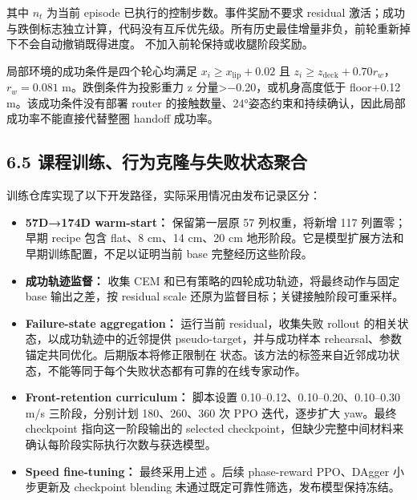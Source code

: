 \documentclass[
  10pt,
  a4paper,
]{article}
\providecommand{\tightlist}{%
  \setlength{\itemsep}{0pt}\setlength{\parskip}{0pt}}
\begin{document}
其中 \(n_t\) 为当前 episode 已执行的控制步数。事件奖励不要求 residual
激活；成功与跌倒标志独立计算，代码没有互斥优先级。所有历史最佳增量非负，前轮重新掉下不会自动撤销既得进度。{\ttfamily\small{}}
不加入前轮保持或收腿阶段奖励。

局部环境的成功条件是四个轮心均满足 \(x_i\ge x_{\mathrm{lip}}+0.02\) 且
\(z_i\ge z_{\mathrm{deck}}+0.70r_w\)，\(r_w=0.081\)
m。跌倒条件为投影重力 z 分量\textgreater−0.20，或机身高度低于 floor+0.12
m。该成功条件没有部署 router
的接触数量、24°姿态约束和持续确认，因此局部成功率不能直接代替整圈
handoff 成功率。

\subsection{6.5
课程训练、行为克隆与失败状态聚合}\label{ux8bfeux7a0bux8badux7ec3ux884cux4e3aux514bux9686ux4e0eux5931ux8d25ux72b6ux6001ux805aux5408}

训练仓库实现了以下开发路径，实际采用情况由发布记录区分：

\begin{itemize}
\tightlist
\item
  \textbf{57D→174D warm-start：} 保留第一层原 57 列权重，将新增 117
  列置零；早期 recipe 包含 flat、8 cm、14 cm、20 cm
  地形阶段。它是模型扩展方法和早期训练配置，不足以证明当前 base
  完整经历这些阶段。
\item
  \textbf{成功轨迹监督：} 收集 CEM
  和已有策略的四轮成功轨迹，将最终动作与固定 base 输出之差，按 residual
  scale 还原为监督目标；关键接触阶段可重采样。
\item
  \textbf{Failure-state aggregation：} 运行当前 residual，收集失败
  rollout 的相关状态，以成功轨迹中的近邻提供 pseudo-target，并与成功样本
  rehearsal、参数锚定共同优化。后期版本将修正限制在
  {\ttfamily\small{}}
  状态。该方法的标签来自近邻成功状态，不能等同于每个失败状态都有可靠的在线专家动作。
\item
  \textbf{Front-retention curriculum：} 脚本设置
  0.10--0.12、0.10--0.20、0.10--0.30 m/s 三阶段，分别计划 180、260、360
  次 PPO 迭代，逐步扩大 yaw。最终
  {\ttfamily\small{}} checkpoint 指向这一阶段输出的
  selected
  checkpoint，但缺少完整中间材料来确认每阶段实际执行次数与获选模型。
\item
  \textbf{Speed fine-tuning：} 最终采用上述
  {\ttfamily\small{}}。后续 phase-reward PPO、DAgger
  小步更新及 checkpoint blending
  未通过既定可靠性筛选，发布模型保持冻结。
\end{itemize}
\end{document}
